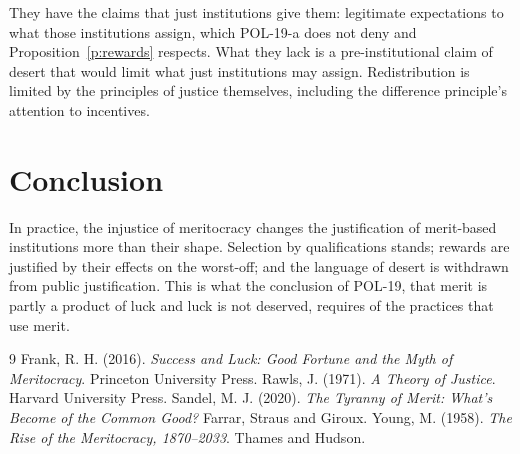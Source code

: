 \documentclass{situationist-preprint}
\begin{document}
\begin{reply}
They have the claims that just institutions give them: legitimate expectations to what those institutions assign, which POL-19-a does not deny and Proposition~\ref{p:rewards} respects. What they lack is a pre-institutional claim of desert that would limit what just institutions may assign. Redistribution is limited by the principles of justice themselves, including the difference principle's attention to incentives.
\end{reply}

\section{Conclusion}

In practice, the injustice of meritocracy changes the justification of merit-based institutions more than their shape. Selection by qualifications stands; rewards are justified by their effects on the worst-off; and the language of desert is withdrawn from public justification. This is what the conclusion of POL-19, that merit is partly a product of luck and luck is not deserved, requires of the practices that use merit.

\begin{thebibliography}{9}\small
{} Frank, R. H. (2016). \emph{Success and Luck: Good Fortune and the Myth of Meritocracy}. Princeton University Press.
 Rawls, J. (1971). \emph{A Theory of Justice}. Harvard University Press.
 Sandel, M. J. (2020). \emph{The Tyranny of Merit: What's Become of the Common Good?} Farrar, Straus and Giroux.
 Young, M. (1958). \emph{The Rise of the Meritocracy, 1870--2033}. Thames and Hudson.
\end{thebibliography}
\end{document}
